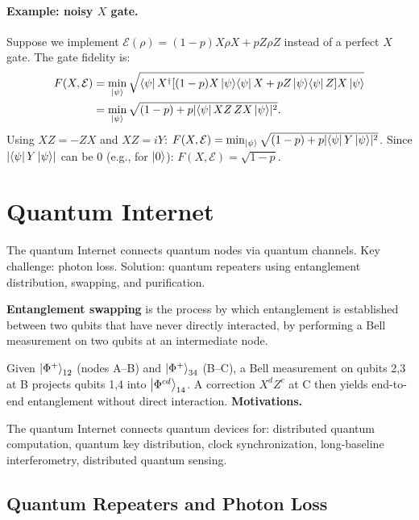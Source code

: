 \documentclass[10pt,a4paper]{article}
\begin{document}
\paragraph{Example: noisy $X$ gate.} Suppose we implement $\mathcal{E}(\rho)=(1-p)X\rho X+pZ\rho Z$ instead of a perfect $X$ gate. The gate fidelity is:
\begin{align*}
F(X,\mathcal{E})&=\min_{\ket{\psi}}\sqrt{\bra{\psi}X^\dagger[(1-p)X\ket{\psi}\!\bra{\psi}X+pZ\ket{\psi}\!\bra{\psi}Z]X\ket{\psi}}\\
&=\min_{\ket{\psi}}\sqrt{(1-p)+p|\!\bra{\psi}XZ\,ZX\ket{\psi}\!|^2}.
\end{align*}
Using $XZ=-ZX$ and $XZ=iY$: $F(X,\mathcal{E})=\min_{\ket{\psi}}\sqrt{(1-p)+p|\!\bra{\psi}Y\ket{\psi}\!|^2}$. Since $|\!\bra{\psi}Y\ket{\psi}\!|$ can be 0 (e.g., for $\ket{0}$): $F(X,\mathcal{E})=\sqrt{1-p}$.

\newpage
\section{Quantum Internet}

The quantum Internet connects quantum nodes via quantum channels. Key challenge: photon loss. Solution: quantum repeaters using entanglement distribution, swapping, and purification.

\begin{tcolorbox}[defstyle, title={Definition}]
\textbf{Entanglement swapping} is the process by which entanglement is established between two qubits that have never directly interacted, by performing a Bell measurement on two qubits at an intermediate node.
\end{tcolorbox}
Given $\ket{\Phi^+}_{12}$ (nodes A--B) and $\ket{\Phi^+}_{34}$ (B--C), a Bell measurement on qubits 2,3 at B projects qubits 1,4 into $\ket{\Phi^{cd}}_{14}$. A correction $X^d Z^c$ at C then yields end-to-end entanglement without direct interaction.
\textbf{Motivations.}

The quantum Internet connects quantum devices for: distributed quantum computation, quantum key distribution, clock synchronization, long-baseline interferometry, distributed quantum sensing.

\subsection{Quantum Repeaters and Photon Loss}
\end{document}
